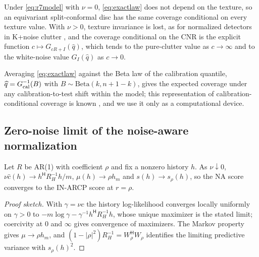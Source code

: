 \begin{corollary}\label{cor:texture}
Under \eqref{eq:r7model} with $\nu=0$, \eqref{eq:exactlaw} does not depend on the texture, so an equivariant split-conformal disc has the same coverage conditional on every texture value. With $\nu>0$, texture invariance is lost, as for normalized detectors in K+noise clutter \cite{gini1997,watts1987,sangston2012}, and the coverage conditional on the CNR is the explicit function $c\mapsto G_{cR+I}(\widehat q)$, which tends to the pure-clutter value as $c\to\infty$ and to the white-noise value $G_I(\widehat q)$ as $c\to0$.
\end{corollary}
Averaging \eqref{eq:exactlaw} against the Beta law of the calibration quantile, $\widehat q=G_{\rm cal}^{-1}(B)$ with $B\sim\mathrm{Beta}(k,n+1-k)$, gives the expected coverage under any calibration-to-test shift within the model; this representation of calibration-conditional coverage is known \cite{vovk2012,ramos2026}, and we use it only as a computational device.

\subsection{Zero-noise limit of the noise-aware normalization}
\begin{proposition}\label{prop:reduce}
Let $R$ be AR(1) with coefficient $\rho$ and fix a nonzero history $h$. As $\nu\downarrow0$, $\nu\widehat c(h)\to h^{\mathsf H}R_H^{-1}h/m$, $\mu(h)\to\rho h_m$ and $s(h)\to s_\rho(h)$, so the NA score converges to the IN-ARCP score at $r=\rho$.
\end{proposition}
\begin{proof}[Proof sketch]
With $\gamma=\nu c$ the history log-likelihood converges locally uniformly on $\gamma>0$ to $-m\log\gamma-\gamma^{-1}h^{\mathsf H}R_H^{-1}h$, whose unique maximizer is the stated limit; coercivity at $0$ and $\infty$ gives convergence of maximizers. The Markov property gives $\mu\to\rho h_m$, and $(1-|\rho|^2)R_H^{-1}=W_\rho^{\mathsf H}W_\rho$ identifies the limiting predictive variance with $s_\rho(h)^2$.
\end{proof}

